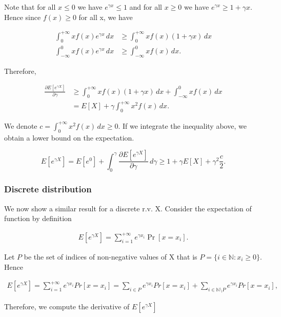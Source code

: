 \documentclass[12pt, a4paper]{article}
\theoremstyle{remark}
\begin{document}
Note that for all $x \leq 0$ we have $e^{\gamma x} \leq 1$ and for all $x \geq 0$ we have $e^{\gamma x} \geq 1 + \gamma x$. Hence since $f(x) \geq 0$ for all x, we have

\begin{align*}
    \int_{0}^{+\infty} x f(x) e^{\gamma x} \, dx & \geq \int_{0}^{+\infty} x f(x) (1 + \gamma x)\, dx \\
    \int_{-\infty}^{0} x f(x) e^{\gamma x} \, dx & \geq \int_{-\infty}^{0} x f(x)\, dx.
\end{align*}

Therefore,

\begin{align*}
    \frac{\partial E[e^{\gamma X}]}{\partial \gamma} & \geq  \int_{0}^{+\infty} x f(x) (1 + \gamma x)\, dx + \int_{-\infty}^{0} x f(x)\, dx \\
    & = E[X] + \gamma \int_{0}^{+\infty} x^2 f(x) \, dx.
\end{align*}

We denote $c = \int_{0}^{+\infty} x^2 f(x) \, dx \geq 0$. If we integrate the inequality above, we obtain a lower bound on the expectation.

\[
    E[e^{\gamma X}] = E[e^{0}] + \int_0^\gamma \frac{\partial E[e^{\gamma X}]}{\partial \gamma} \, d\gamma \geq 1 + \gamma E[X] + \gamma^2 \frac{c}{2}.
\]

\subsubsection*{Discrete distribution}

We now show a similar result for a discrete r.v. X. Consider the expectation of function by definition

\begin{align*}
    E[e^{\gamma X}] = \sum_{i = 1}^{+\infty} e^{\gamma x_i} \Pr[x = x_i].
\end{align*}


Let $P$ be the set of indices of non-negative values of X that is \(P = \{i \in \mathbb{N} : x_i \geq 0\}\). Hence

\begin{align*}
    E[e^{\gamma X}] = \sum_{i = 1}^{+\infty} e^{\gamma x_i} Pr[x = x_i] = \sum_{i \in P} e^{\gamma x_i} Pr[x = x_i] + \sum_{i \in \mathbb{N}\setminus P} e^{\gamma x_i} Pr[x = x_i],
\end{align*}

Therefore, we compute the derivative of \(E\left[e^{\gamma X}\right]\)
\end{document}
